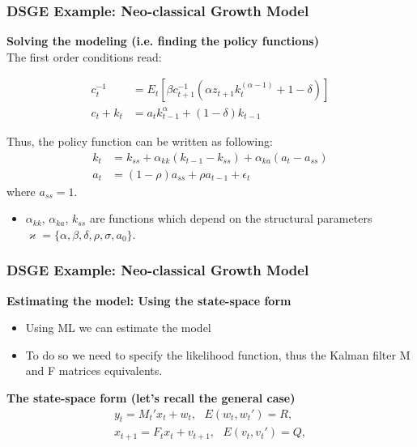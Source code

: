 \documentclass[notes=show]{beamer}%
\begin{document}
\begin{frame}

\frametitle{DSGE Example: Neo-classical Growth Model}
\textbf{Solving the modeling (i.e. finding the policy functions)} \\
\bigskip
The first order conditions read:

\begin{align}
c_{t}^{-1}&=E_{t}[\beta c_{t+1}^{-1}(\alpha z_{t+1}k_{t}^(\alpha-1)+1-\delta)]\\
c_{t}+k_{t}&=a_{t}k_{t-1}^\alpha+(1-\delta)k_{t-1}
\end{align}

Thus, the policy function can be written as following:
\begin{align}
k_{t}&=k_{ss}+\alpha_{kk}(k_{t-1}-k_{ss})+ \alpha_{ka}(a_{t}-a_{ss})\\
a_{t}&=(1-\rho)a_{ss}+\rho a_{t-1}+\epsilon_{t} 
\end{align}
where $a_{ss}=1$.

\begin{itemize}
\item $\alpha_{kk}$, $\alpha_{ka}$, $k_{ss}$ are functions which depend on the structural parameters $\varkappa=\{\alpha,\beta,\delta,\rho,\sigma,a_{0}\}$.
\end{itemize}

\end{frame}

\begin{frame}

\frametitle{DSGE Example: Neo-classical Growth Model}
\textbf{Estimating the model: Using the state-space form} \\
\bigskip
\begin{itemize}
\item Using ML we can estimate the model
\item To do so we need to specify the likelihood function, thus the Kalman filter M and F matrices equivalents.
\end{itemize}
\bigskip
\textbf{The state-space form (let's recall the general case)} \\

\begin{align}
y_{t}= M_{t}' x_{t}+w_{t}, \text{     } E(w_{t},w_{t}')=R, \nonumber\\
x_{t+1}= F_{t} x_{t}+v_{t+1}, \text{     } E(v_{t},v_{t}')=Q,\nonumber
\end{align}


\end{frame}
\end{document}
